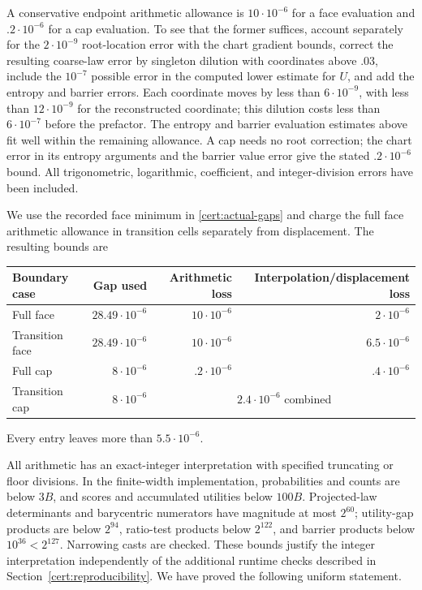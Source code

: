 A conservative endpoint arithmetic allowance is $10\cdot10^{-6}$ for
a face evaluation and $.2\cdot10^{-6}$ for a cap evaluation.  To see
that the former suffices, account separately for the $2\cdot10^{-9}$
root-location error with the chart gradient bounds, correct the resulting
coarse-law error by singleton dilution with coordinates above $.03$,
include the $10^{-7}$ possible error in the computed lower estimate for
$U$, and add the entropy and barrier errors.  Each coordinate moves by
less than $6\cdot10^{-9}$, with less than $12\cdot10^{-9}$ for the
reconstructed coordinate; this dilution costs less than $6\cdot10^{-7}$
before the prefactor.  The entropy and barrier evaluation estimates above
fit well within the remaining allowance.  A cap needs no root correction;
the chart error in its entropy arguments and the barrier value error give
the stated $.2\cdot10^{-6}$ bound.  All trigonometric, logarithmic,
coefficient, and integer-division errors have been included.

We use the recorded face minimum in \eqref{cert:actual-gaps} and charge
the full face arithmetic allowance in transition cells separately from
displacement.  The resulting bounds are
\begin{center}
\begin{tabular}{lrrr}\toprule
Boundary case&Gap used&Arithmetic loss&Interpolation/displacement loss\\\midrule
Full face&$28.49\cdot10^{-6}$&$10\cdot10^{-6}$&$2\cdot10^{-6}$\\
Transition face&$28.49\cdot10^{-6}$&$10\cdot10^{-6}$&$6.5\cdot10^{-6}$\\
Full cap&$8\cdot10^{-6}$&$.2\cdot10^{-6}$&$.4\cdot10^{-6}$\\
Transition cap&$8\cdot10^{-6}$&\multicolumn{2}{c}{$2.4\cdot10^{-6}$ combined}\\\bottomrule
\end{tabular}
\end{center}
Every entry leaves more than $5.5\cdot10^{-6}$.

All arithmetic has an exact-integer interpretation with specified
truncating or floor divisions.  In the finite-width implementation,
probabilities and counts are below $3B$, and scores and accumulated
utilities below $100B$.  Projected-law determinants and barycentric
numerators have magnitude at most $2^{60}$; utility-gap products are
below $2^{94}$, ratio-test products below $2^{122}$, and barrier
products below $10^{36}<2^{127}$.  Narrowing casts are checked.
These bounds justify the integer interpretation independently of the
additional runtime checks described in Section~\ref{cert:reproducibility}.
We have proved the following uniform statement.

